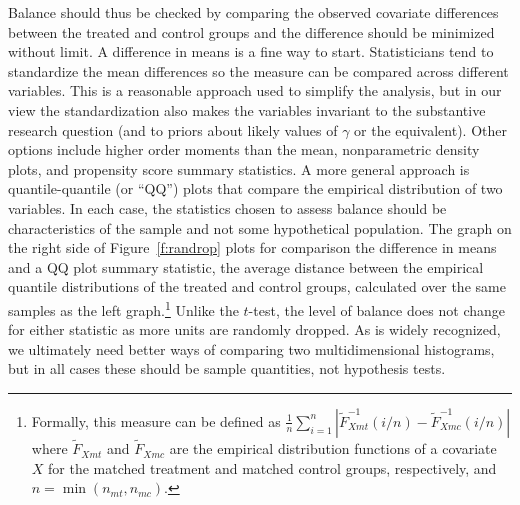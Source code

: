 \documentclass[11pt,titlepage]{article}
\begin{document}
Balance should thus be checked by comparing the observed covariate
differences between the treated and control groups and the difference
should be minimized without limit.  A difference in means is a fine
way to start.  Statisticians tend to standardize the mean differences
so the measure can be compared across different variables.  This is a
reasonable approach used to simplify the analysis, but in our view the
standardization also makes the variables invariant to the substantive
research question (and to priors about likely values of $\gamma$ or
the equivalent).  Other options include higher order moments than the
mean, nonparametric density plots, and propensity score summary
statistics. A more general approach is quantile-quantile (or ``QQ'')
plots that compare the empirical distribution of two variables.  In
each case, the statistics chosen to assess balance should be
characteristics of the sample and not some hypothetical population.
The graph on the right side of Figure~\ref{f:randrop} plots for
comparison the difference in means and a QQ plot summary statistic,
the average distance between the empirical quantile distributions of
the treated and control groups, calculated over the same samples as
the left graph.\footnote{Formally, this measure can be defined as
  $\frac{1}{n} \sum_{i=1}^n |\widetilde{F}_{Xmt}^{-1}(i/n) -
  \widetilde{F}^{-1}_{Xmc}(i/n)|$ where $\widetilde{F}_{Xmt}$ and
  $\widetilde{F}_{Xmc}$ are the empirical distribution functions of a
  covariate $X$ for the matched treatment and matched control groups,
  respectively, and $n=\min(n_{mt},n_{mc})$.}  Unlike the $t$-test,
the level of balance does not change for either statistic as more
units are randomly dropped.  As is widely recognized, we ultimately
need better ways of comparing two multidimensional histograms, but in
all cases these should be sample quantities, not hypothesis tests.


\clearpage


\end{document}
